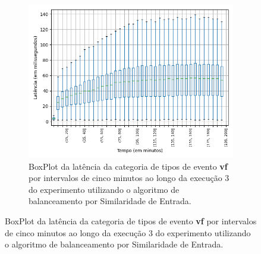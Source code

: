 

\begin{figure}
\centering
\begin{subfigure}{.5\textwidth}
\centering
\includegraphics[width=\textwidth]{figuras/graphics/boxplot_8-dez-is_vf.png}
\caption{BoxPlot da latência da categoria de tipos de evento \textbf{vf} por intervalos de cinco minutos ao longo da execução 3 do experimento utilizando o algoritmo de balanceamento por Similaridade de Entrada.}
\label{fig:BoxPlot_vf_8-dez-is}
\end{subfigure}%


\end{figure}
